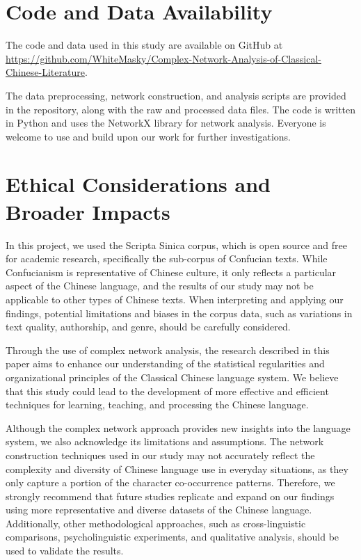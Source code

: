 \documentclass[11pt]{article}
\begin{document}
\section*{Code and Data Availability}
The code and data used in this study are available on GitHub at \url{https://github.com/WhiteMasky/Complex-Network-Analysis-of-Classical-Chinese-Literature}. 

The data preprocessing, network construction, and analysis scripts are provided in the repository, along with the raw and processed data files. The code is written in Python and uses the NetworkX library for network analysis. Everyone is welcome to use and build upon our work for further investigations.
\section*{Ethical Considerations and Broader Impacts}
In this project, we used the Scripta Sinica corpus, which is open source and free for academic research, specifically the sub-corpus of Confucian texts. While Confucianism is representative of Chinese culture, it only reflects a particular aspect of the Chinese language, and the results of our study may not be applicable to other types of Chinese texts. When interpreting and applying our findings, potential limitations and biases in the corpus data, such as variations in text quality, authorship, and genre, should be carefully considered.

Through the use of complex network analysis, the research described in this paper aims to enhance our understanding of the statistical regularities and organizational principles of the Classical Chinese language system. We believe that this study could lead to the development of more effective and efficient techniques for learning, teaching, and processing the Chinese language.

Although the complex network approach provides new insights into the language system, we also acknowledge its limitations and assumptions. The network construction techniques used in our study may not accurately reflect the complexity and diversity of Chinese language use in everyday situations, as they only capture a portion of the character co-occurrence patterns. Therefore, we strongly recommend that future studies replicate and expand on our findings using more representative and diverse datasets of the Chinese language. Additionally, other methodological approaches, such as cross-linguistic comparisons, psycholinguistic experiments, and qualitative analysis, should be used to validate the results.
\end{document}

